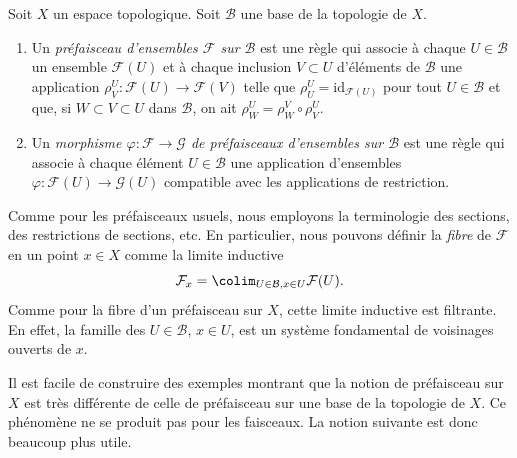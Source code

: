 \begin{definition}
\label{definition-presheaf-basis}
Soit $X$ un espace topologique. Soit $\mathcal{B}$ une
base de la topologie de $X$.
\begin{enumerate}
\item Un {\it préfaisceau d'ensembles $\mathcal{F}$ sur $\mathcal{B}$}
est une règle qui associe à chaque $U \in \mathcal{B}$ un ensemble
$\mathcal{F}(U)$ et à chaque inclusion $V \subset U$
d'éléments de $\mathcal{B}$ une application
$\rho^U_V : \mathcal{F}(U) \to \mathcal{F}(V)$ telle que
$\rho^U_U = \text{id}_{\mathcal{F}(U)}$ pour tout $U \in \mathcal{B}$ et que,
si $W \subset V \subset U$ dans $\mathcal{B}$, on ait
$\rho^U_W = \rho^V_W \circ \rho ^U_V$.
\item Un {\it morphisme $\varphi : \mathcal{F} \to \mathcal{G}$
de préfaisceaux d'ensembles sur $\mathcal{B}$} est une règle qui associe à chaque
élément $U \in \mathcal{B}$ une application d'ensembles $\varphi : \mathcal{F}(U)
\to \mathcal{G}(U)$ compatible avec les applications de restriction.
\end{enumerate}
\end{definition}

\noindent
Comme pour les préfaisceaux usuels, nous employons la terminologie des sections,
des restrictions de sections, etc. En particulier, nous pouvons définir la
{\it fibre} de $\mathcal{F}$ en un point $x \in X$ comme la
limite inductive
$$
\mathcal{F}_x = \colim_{U\in \mathcal{B}, x\in U} \mathcal{F}(U).
$$
Comme pour la fibre d'un préfaisceau sur $X$, cette limite inductive est
filtrante. En effet, la famille des $U\in \mathcal{B}$,
$x \in U$, est un système fondamental de voisinages ouverts de $x$.

\medskip\noindent
Il est facile de construire des exemples montrant que la notion de préfaisceau
sur $X$ est très différente de celle de préfaisceau sur une base
de la topologie de $X$. Ce phénomène ne se produit pas pour les
faisceaux. La notion suivante est donc beaucoup plus utile.


